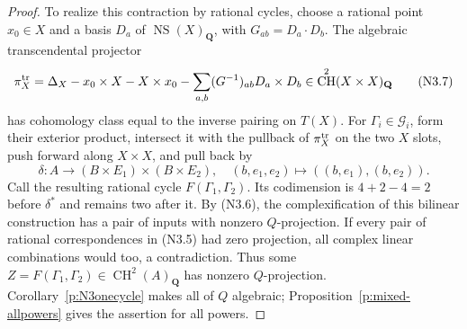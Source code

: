\documentclass[10pt,reqno]{article}
\theoremstyle{emphasizedplain}
\theoremstyle{emphasizeddefinition}
\theoremstyle{emphasizeddefinition}
\DeclareMathOperator{\NS}{NS}
\DeclareMathOperator{\CH}{CH}
\newcommand{\Q}{\mathbf Q}
\begin{document}
\begin{proof}
To realize this contraction by rational cycles, choose a rational
point $x_0\in X$ and a basis $D_a$ of $\NS(X)_\Q$, with
$G_{ab}=D_a\cdot D_b$. The algebraic transcendental projector
\[
 \pi_X^{\rm tr}=\Delta_X-x_0\times X-X\times x_0
   -\sum_{a,b}(G^{-1})_{ab}D_a\times D_b
   \in\CH^2(X\times X)_\Q                          \tag{N3.7}
\]
has cohomology class equal to the inverse pairing on $T(X)$.
For $\Gamma_i\in\mathcal G_i$, form their exterior product,
intersect it with the pullback of $\pi_X^{\rm tr}$ on the two
$X$ slots, push forward along $X\times X$, and pull back by
\[
 \delta:A\longrightarrow(B\times E_1)\times(B\times E_2),
 \quad(b,e_1,e_2)\longmapsto((b,e_1),(b,e_2)).
\]
Call the resulting rational cycle $F(\Gamma_1,\Gamma_2)$.
Its codimension is $4+2-4=2$ before $\delta^*$ and remains two
after it. By (N3.6), the complexification of this bilinear
construction has a pair of inputs with nonzero $Q$-projection.
If every pair of rational correspondences in (N3.5) had zero
projection, all complex linear combinations would too, a
contradiction. Thus some
$Z=F(\Gamma_1,\Gamma_2)\in\CH^2(A)_\Q$ has nonzero
$Q$-projection. Corollary~\ref{p:N3onecycle} makes all of $Q$
algebraic; Proposition~\ref{p:mixed-allpowers} gives the assertion
for all powers.\qedhere
\end{proof}
\end{document}

